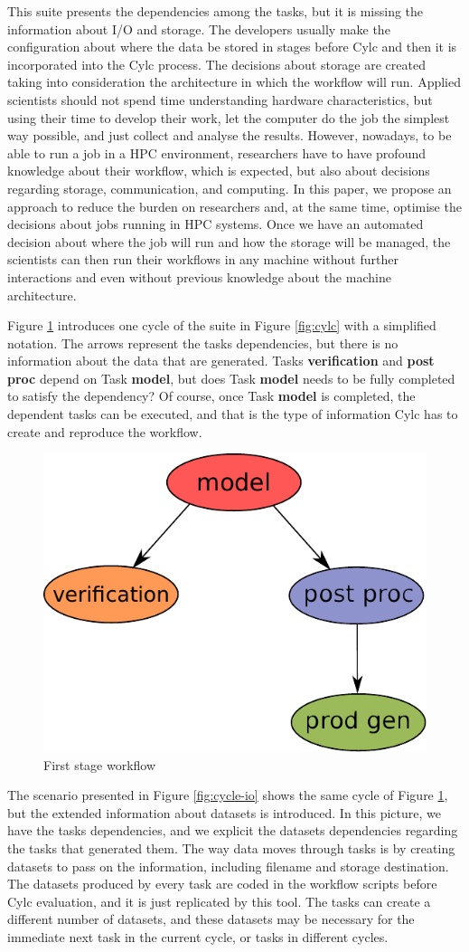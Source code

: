 \documentclass[a4paper]{article}
\begin{document}
{{{{This suite presents the dependencies among the tasks, but it is missing the information about I/O and storage. The developers usually make the configuration about where the data be stored in stages before Cylc and then it is incorporated into the Cylc process. The decisions about storage are created taking into consideration the architecture in which the workflow will run. Applied scientists should not spend time understanding hardware characteristics, but using their time to develop their work, let the computer do the job the simplest way possible, and just collect and analyse the results. However, nowadays, to be able to run a job in a HPC environment, researchers have to have profound knowledge about their workflow, which is expected, but also about decisions regarding storage, communication, and computing. In this paper, we propose an approach to reduce the burden on researchers and, at the same time, optimise the decisions about jobs running in HPC systems. Once we have an automated decision about where the job will run and how the storage will be managed, the scientists can then run their workflows in any machine without further interactions and even without previous knowledge about the machine architecture.

Figure \ref{fig:cycle1} introduces one cycle of the suite in Figure \ref{fig:cylc} with a simplified notation. The arrows represent the tasks dependencies, but there is no information about the data that are generated. Tasks \textbf{verification} and \textbf{post\,proc} depend on Task \textbf{model}, but does Task \textbf{model} needs to be fully completed to satisfy the dependency? Of course, once Task \textbf{model} is completed, the dependent tasks can be executed, and that is the type of information Cylc has to create and reproduce the workflow.

\begin{figure}[H]
  \centering
  \includegraphics[width=0.4\columnwidth]{cycle1}
  \caption{First stage workflow}
  \label{fig:cycle1}
\end{figure}

The scenario presented in Figure \ref{fig:cycle-io} shows the same cycle of Figure \ref{fig:cycle1}, but the extended information about datasets is introduced.
In this picture, we have the tasks dependencies, and we explicit the datasets dependencies regarding the tasks that generated them.
The way data moves through tasks is by creating datasets to pass on the information, including filename and storage destination. The datasets produced by every task are coded in the workflow scripts before Cylc evaluation, and it is just replicated by this tool. The tasks can create a different number of datasets, and these datasets may be necessary for the immediate next task in the current cycle, or tasks in different cycles.

}}}}
\end{document}
